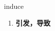 
\begin{frame}
{\huge induce}
\begin{center}
\begin{enumerate}\Large
  \item \textbf{引发，导致}
\end{enumerate}
\end{center}
\end{frame}
